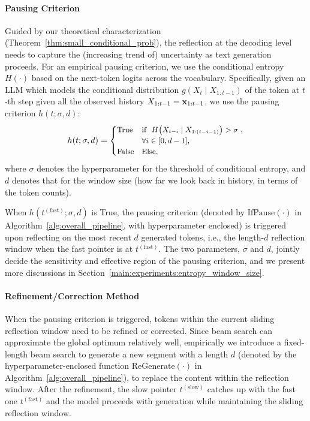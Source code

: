 \paragraph{Pausing Criterion}
Guided by our theoretical characterization (Theorem~\ref{thm:small_conditional_prob}), the reflection at the decoding level needs to capture the (increasing trend of) uncertainty as text generation proceeds.
For an empirical pausing criterion, we use the conditional entropy $H(\cdot)$ based on the next-token logits across the vocabulary.
Specifically, given an LLM which models the conditional distribution $g(X_{t} \mid X_{1:t-1})$ of the token at $t$-th step given all the observed history $X_{1:t-1}= \mathbf{x}_{1:t - 1}$, we use the pausing criterion $h(t; \sigma, d)$:
\begin{equation}
    \small
    h(t; \sigma, d) =
    \begin{cases}
        \text{True}  & \text{if }~H\big( X_{t - i} \mid X_{1:(t - i - 1)} \big) > \sigma~, \\
                     & \forall i \in [0,d-1],                                              \\
        \text{False} & \text{Else},
    \end{cases}
\end{equation}
where $\sigma$ denotes the hyperparameter for the threshold of conditional entropy, and $d$ denotes that for the window size (how far we look back in history, in terms of the token counts).

When $h(t^{\mathrm{(fast)}}; \sigma, d)$ is True, the pausing criterion (denoted by $\mathrm{IfPause(\cdot)}$ in Algorithm~\ref{alg:overall_pipeline}, with hyperparameter enclosed) is triggered upon reflecting on the most recent $d$ generated tokens, i.e., the length-$d$ reflection window when the fast pointer is at $t^{\mathrm{(fast)}}$.
The two parameters, $\sigma$ and $d$, jointly decide the sensitivity and effective region of the pausing criterion, and we present more discussions in Section~\ref{main:experiments:entropy_window_size}.

\paragraph{Refinement/Correction Method}
When the pausing criterion is triggered, tokens within the current sliding reflection window need to be refined or corrected.
Since beam search can approximate the global optimum relatively well, empirically we introduce a fixed-length beam search to generate a new segment with a length $d$ (denoted by the hyperparameter-enclosed function $\mathrm{ReGenerate(\cdot)}$ in Algorithm~\ref{alg:overall_pipeline}), to replace the content within the reflection window.
After the refinement, the slow pointer $t^{\mathrm{(slow)}}$ catches up with the fast one $t^{\mathrm{(fast)}}$ and the model proceeds with generation while maintaining the sliding reflection window.

